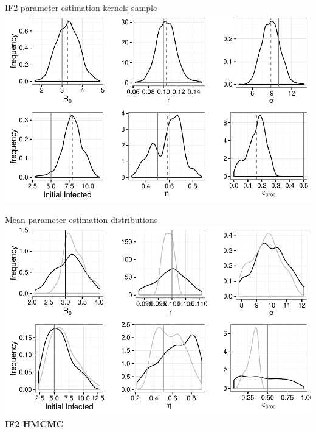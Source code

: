 \documentclass[12pt]{beamer}
\begin{document}
\begin{frame}

	\null
	\vfill
	IF2 parameter estimation kernels sample \\
	\vspace{\baselineskip}
	\includegraphics[width=\textwidth,height=\textheight,keepaspectratio=true]{../../writing/SC1/images/if2kernels}
	\vfill

\end{frame}



\begin{frame}

	\null
	\vfill
	Mean parameter estimation distributions \\
	\vspace{\baselineskip}
	\includegraphics[width=\textwidth,height=\textheight,keepaspectratio=true]{../../writing/SC1/images/combined-multi} \\
	\centering
	\textbf{IF2 \quad \textcolor{Grey50}{HMCMC}}
	\vfill

\end{frame}
\end{document}
